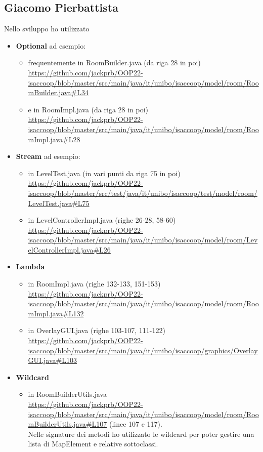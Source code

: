 \documentclass[a4paper,12pt]{report}
\begin{document}
\subsection*{Giacomo Pierbattista}
Nello sviluppo ho utilizzato
\begin{itemize}
\item \textbf{Optional} ad esempio:
    \begin{itemize}
        \item frequentemente in RoomBuilder.java (da riga 28 in poi) \url{https://github.com/jackprb/OOP22-isaccoop/blob/master/src/main/java/it/unibo/isaccoop/model/room/RoomBuilder.java#L34}
        \item e in RoomImpl.java (da riga 28 in poi) \url{https://github.com/jackprb/OOP22-isaccoop/blob/master/src/main/java/it/unibo/isaccoop/model/room/RoomImpl.java#L28}
    \end{itemize}
\item \textbf{Stream} ad esempio: 
    \begin{itemize}
        \item in LevelTest.java (in vari punti da riga 75 in poi) \url{https://github.com/jackprb/OOP22-isaccoop/blob/master/src/test/java/it/unibo/isaccoop/test/model/room/LevelTest.java#L75}
        \item in LevelControllerImpl.java (righe 26-28, 58-60) \url{https://github.com/jackprb/OOP22-isaccoop/blob/master/src/main/java/it/unibo/isaccoop/model/room/LevelControllerImpl.java#L26}
    \end{itemize}
\item \textbf{Lambda}     
    \begin{itemize}
        \item in RoomImpl.java (righe 132-133, 151-153) \\\url{https://github.com/jackprb/OOP22-isaccoop/blob/master/src/main/java/it/unibo/isaccoop/model/room/RoomImpl.java#L132}
        \item in OverlayGUI.java (righe 103-107, 111-122) \\\url{https://github.com/jackprb/OOP22-isaccoop/blob/master/src/main/java/it/unibo/isaccoop/graphics/OverlayGUI.java#L103}
    \end{itemize}
\item \textbf{Wildcard} 
    \begin{itemize}
        \item in RoomBuilderUtils.java
    \\\url{https://github.com/jackprb/OOP22-isaccoop/blob/master/src/main/java/it/unibo/isaccoop/model/room/RoomBuilderUtils.java#L107}
    (linee 107 e 117). \\Nelle signature dei metodi ho utilizzato le wildcard per poter gestire una lista di MapElement e relative sottoclassi.
    \end{itemize}
\end{itemize}
\end{document}
